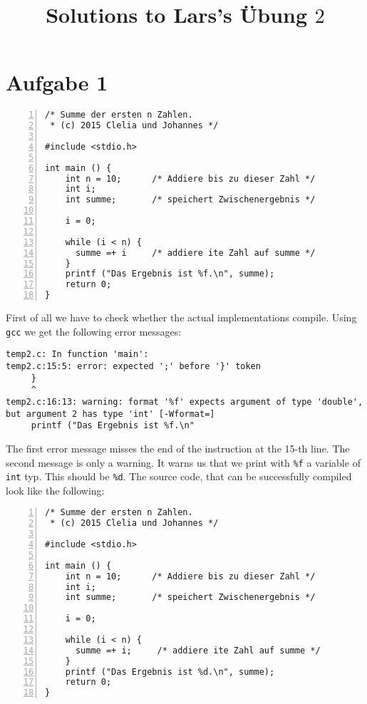 \documentclass{article}[12pt]
\title{Solutions to Lars's Übung $2$}
\newenvironment{codelisting}{\fontfamily{pcr}\selectfont%
\lstset{commentstyle=\textit}\lstset{language=c}}{\fontfamily{ptm}\selectfont}
\begin{document}
\maketitle
\section{Aufgabe 1}
\begin{codelisting}
\begin{lstlisting}[numbers=left,numberstyle=\tiny,frame=tlrb,showstringspaces=false]
/* Summe der ersten n Zahlen.
 * (c) 2015 Clelia und Johannes */

#include <stdio.h>

int main () {
    int n = 10;      /* Addiere bis zu dieser Zahl */
    int i;
    int summe;       /* speichert Zwischenergebnis */   
    
    i = 0;
    
    while (i < n) {
      summe =+ i     /* addiere ite Zahl auf summe */
    }    
    printf ("Das Ergebnis ist %f.\n", summe);
    return 0;
}
\end{lstlisting}
\end{codelisting}
First of all we have to check whether the actual implementations compile. Using \texttt{gcc} we get the following 
error messages:
\begin{lstlisting}
temp2.c: In function 'main':
temp2.c:15:5: error: expected ';' before '}' token
     }
     ^
temp2.c:16:13: warning: format '%f' expects argument of type 'double', but argument 2 has type 'int' [-Wformat=]
     printf ("Das Ergebnis ist %f.\n"
\end{lstlisting}
The first error message misses the end of the instruction at the 15-th line. The second message is only a warning.
It warns us that we print with \texttt{\%f} a variable of \texttt{int} typ. This should be \texttt{\%d}.
The source code, that can be successfully compiled look like the following:
\begin{codelisting}
\begin{lstlisting}[numbers=left,numberstyle=\tiny,frame=tlrb,showstringspaces=false]
/* Summe der ersten n Zahlen.
 * (c) 2015 Clelia und Johannes */

#include <stdio.h>

int main () {
    int n = 10;      /* Addiere bis zu dieser Zahl */
    int i;
    int summe;       /* speichert Zwischenergebnis */

    i = 0;

    while (i < n) {
      summe =+ i;     /* addiere ite Zahl auf summe */
    }
    printf ("Das Ergebnis ist %d.\n", summe);
    return 0;
}
\end{lstlisting}
\end{codelisting}
\end{document}
